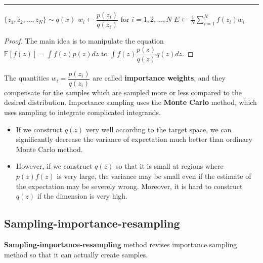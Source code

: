 \documentclass{article}
\begin{document}
        \begin{algorithm}[H]
            \DontPrintSemicolon
            \caption{Importance sampling algorithm}


            \BlankLine
            \hrule

            $\{z_1, z_2, \dots, z_N\} \sim q(x)$\;
            $w_i \leftarrow \dfrac{p(z_i)}{q(z_i)}$ for $i=1,2,\dots,N$\;
            $\displaystyle{E \leftarrow \frac{1}{N}\sum_{i=1}^{N}f(z_i)w_i}$

        \end{algorithm}
        \begin{proof}
            The main idea is to manipulate the equation $\mathbb{E}[f(z)]=\displaystyle\int f(z)p(z)dz$ to $\displaystyle\int f(z)\dfrac{p(z)}{q(z)}q(z)dz$.
        \end{proof}

        The quantities $w_i = \dfrac{p(z_i)}{q(z_i)}$ are called \textbf{importance weights}, and they compensate for the samples which are sampled more or less compared to
        the desired distribution.
        Importance sampling uses the \textbf{Monte Carlo} method, which uses sampling to integrate complicated integrands.

        \begin{itemize}
            \item If we construct $q(z)$ very well according to the target space, we can significantly decrease the variance of expectation
                much better than ordinary Monte Carlo method.
            \item However, if we construct $q(z)$ so that it is small at regions where $p(z)f(z)$ is very large, the variance may be small even
                if the estimate of the expectation may be severely wrong. Moreover, it is hard to construct $q(z)$ if the dimension is very high.
        \end{itemize}

        

    \subsection{Sampling-importance-resampling}
        \textbf{Sampling-importance-resampling} method revises importance sampling method so that it can actually create samples.
\end{document}
